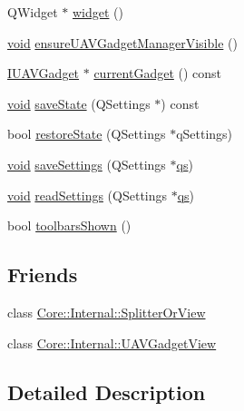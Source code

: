 \begin{DoxyCompactItemize}
\item 
Q\-Widget $\ast$ \hyperlink{group___core_plugin_ga25fccbeabcca631b76af421f136114db}{widget} ()
\item 
\hyperlink{group___u_a_v_objects_plugin_ga444cf2ff3f0ecbe028adce838d373f5c}{void} \hyperlink{group___core_plugin_ga8c12c4c05d96b0f0b5015971c8501ed7}{ensure\-U\-A\-V\-Gadget\-Manager\-Visible} ()
\item 
\hyperlink{class_core_1_1_i_u_a_v_gadget}{I\-U\-A\-V\-Gadget} $\ast$ \hyperlink{group___core_plugin_gae3f5fe2cc834973db82aa3df3400b297}{current\-Gadget} () const 
\item 
\hyperlink{group___u_a_v_objects_plugin_ga444cf2ff3f0ecbe028adce838d373f5c}{void} \hyperlink{group___core_plugin_ga3ac2a36a18132cd5997fc77934910eb4}{save\-State} (Q\-Settings $\ast$) const 
\item 
bool \hyperlink{group___core_plugin_gae6d15e0e2e171db06945917f6f330488}{restore\-State} (Q\-Settings $\ast$q\-Settings)
\item 
\hyperlink{group___u_a_v_objects_plugin_ga444cf2ff3f0ecbe028adce838d373f5c}{void} \hyperlink{group___core_plugin_gae098f8fd57c1689becd25fe77165ba58}{save\-Settings} (Q\-Settings $\ast$\hyperlink{analyze_i_n_s_g_p_s_8m_a620a138c8981e0536c569d7761df4548}{qs})
\item 
\hyperlink{group___u_a_v_objects_plugin_ga444cf2ff3f0ecbe028adce838d373f5c}{void} \hyperlink{group___core_plugin_gadd58657a986d6952a7916697c6d776bf}{read\-Settings} (Q\-Settings $\ast$\hyperlink{analyze_i_n_s_g_p_s_8m_a620a138c8981e0536c569d7761df4548}{qs})
\item 
bool \hyperlink{group___core_plugin_gac0cf41fa8cd010a9d8df7de3a54a7987}{toolbars\-Shown} ()
\end{DoxyCompactItemize}
\subsection*{Friends}
\begin{DoxyCompactItemize}
\item 
class \hyperlink{group___core_plugin_ga60e1336d12b6e13453f7f00503a94d6c}{Core\-::\-Internal\-::\-Splitter\-Or\-View}
\item 
class \hyperlink{group___core_plugin_ga30a55036c55042e1e256be357df9b612}{Core\-::\-Internal\-::\-U\-A\-V\-Gadget\-View}
\end{DoxyCompactItemize}


\subsection{Detailed Description}


